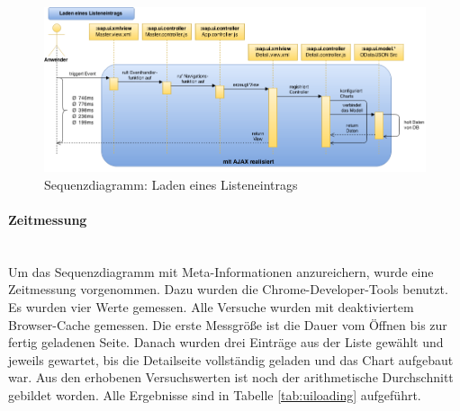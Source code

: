 \vspace{1em}
\begin{figure}[htb]
  \centering
  \includegraphics[width=1.1\linewidth,angle=90]{abb/sapui5_load_list_entry}
  \caption[Sequenzdiagramm: Laden eines Listeneintrags]{Sequenzdiagramm: Laden eines Listeneintrags}
  \label{fig:sapui5loadlistentry}
\end{figure}

\paragraph{Zeitmessung}$\;$ \\
Um das Sequenzdiagramm mit Meta-Informationen anzureichern, wurde eine Zeitmessung vorgenommen. Dazu wurden die Chrome-Developer-Tools benutzt. Es wurden vier Werte gemessen. Alle Versuche wurden mit deaktiviertem Browser-Cache gemessen. Die erste Messgröße ist die Dauer vom Öffnen bis zur fertig geladenen Seite. Danach wurden drei Einträge aus der Liste gewählt und jeweils gewartet, bis die Detailseite vollständig geladen und das Chart aufgebaut war. Aus den erhobenen Versuchswerten ist noch der arithmetische Durchschnitt gebildet worden. Alle Ergebnisse sind in Tabelle \ref{tab:uiloading} aufgeführt.

